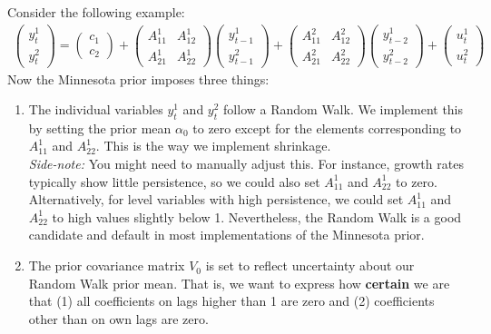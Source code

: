 \begin{enumerate}
Consider the following example:
\begin{align*}
    \begin{pmatrix} y_t^1\\y_t^2 \end{pmatrix} = 
    \begin{pmatrix} c_1\\c_2 \end{pmatrix} 
    + \begin{pmatrix} A_{11}^1 & A_{12}^1\\A_{21}^1 & A_{22}^1 \end{pmatrix} 
    \begin{pmatrix} y_{t-1}^1\\y_{t-1}^2 \end{pmatrix} 
    + \begin{pmatrix} A_{11}^2 & A_{12}^2\\A_{21}^2 & A_{22}^2 \end{pmatrix} 
    \begin{pmatrix} y_{t-2}^1\\y_{t-2}^2 \end{pmatrix} 
    + \begin{pmatrix} u_t^1\\u_t^2 \end{pmatrix}
\end{align*}
Now the Minnesota prior imposes three things:
\begin{enumerate}
    \item The individual variables \(y_t^1\) and \(y_t^2\) follow a Random Walk.
    We implement this by setting the prior mean \(\alpha_0\) to zero
    except for the elements corresponding to \(A_{11}^1\) and \(A_{22}^1\).
    This is the way we implement shrinkage.
    \\
    \emph{Side-note:} You might need to manually adjust this.
    For instance, growth rates typically show little persistence, so we could also set \(A_{11}^1\) and \(A_{22}^1\) to zero.
    Alternatively, for level variables with high persistence, we could set \(A_{11}^1\) and \(A_{22}^1\) to high values slightly below 1.
    Nevertheless, the Random Walk is a good candidate
    and default in most implementations of the Minnesota prior.
    \item The prior covariance matrix \(V_0\) is set to reflect uncertainty about our Random Walk prior mean.
    That is, we want to express how \textbf{certain} we are that
    (1) all coefficients on lags higher than 1 are zero and 
    (2) coefficients other than on own lags are zero.

\end{enumerate}
\end{enumerate}
